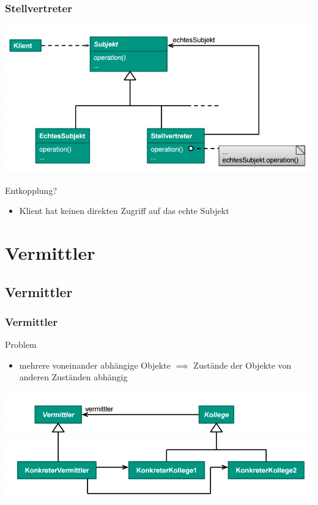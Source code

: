 \documentclass[18pt]{beamer}
\begin{document}
	\begin{frame}
		\frametitle{Stellvertreter}
		\centering
		\includegraphics[scale=0.4]{./pics/tut3/prox.png}
		\begin{block}{Entkopplung?}
			\begin{itemize}
				\pause 
				\item Klient hat keinen direkten Zugriff auf das echte Subjekt
			\end{itemize}
		\end{block}
	\end{frame}

\section{Vermittler}
	\subsection{Vermittler}
		\begin{frame}
		\frametitle{Vermittler}
		\begin{block}{Problem}
			\begin{itemize}
				\item mehrere voneinander abhängige Objekte \linebreak \pause $\implies$ Zustände der Objekte von anderen Zuständen abhängig
			\end{itemize}
		\end{block}
		\pause
		\centering
		\includegraphics[scale=0.45]{./pics/tut3/med.png}
	\end{frame}
\end{document}
